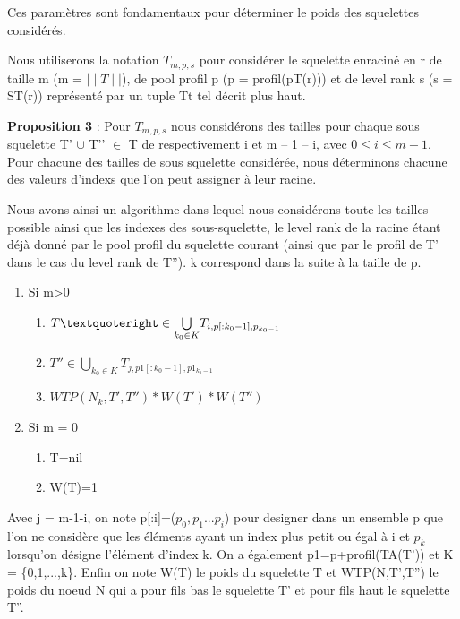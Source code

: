 \documentclass[french]{article}
\begin{document}
Ces paramètres sont fondamentaux pour déterminer le poids des squelettes considérés.

Nous utiliserons la notation \(T_{m,p,s} \) pour considérer le squelette enraciné en r de taille m (m =  \(\mid\mid T\mid\mid\)), de pool profil p (p = profil(pT(r))) et de level rank s (s = ST(r)) représenté par un tuple Tt tel décrit plus haut.


\textbf{Proposition 3} :  Pour \(T_{m,p,s} \) nous considérons des tailles pour chaque sous squelette T’ \(\cup\) T’’ \(\in\) T de respectivement i et m – 1 – i, avec \(0\leq i\leq m-1\). Pour chacune des tailles de sous squelette considérée, nous déterminons chacune des valeurs d'indexs que l'on peut assigner à leur racine.

Nous avons ainsi un algorithme dans lequel nous considérons toute les tailles possible ainsi que les indexes des sous-squelette, le level rank de la racine étant déjà donné par le pool profil du squelette courant (ainsi que par le profil de T' dans le cas du level rank de T''). k correspond dans la suite à la taille de p.

\begin{enumerate}
    \item Si m>0
        \begin{enumerate}
            \item
            \(T\textquoteright \in \underset{k_0\in K}{\bigcup} T_{i,p[:k_0-1],p_{k_0-1}} \)
            \item
            \(T'' \in \underset{k_0\in K}{\bigcup} T_{j,p1[:k_0-1],p1_{k_0-1}} \)
            \item
            $WTP(N_k,T',T'')*W(T')*W(T'')$
        \end{enumerate}
 
    \item Si m = 0
        \begin{enumerate} 
            \item
            T=nil 
            \item
            W(T)=1
        \end{enumerate}
\end{enumerate}
Avec j = m-1-i, on note p[:i]=(\(p_0,p_1...p_i\)) pour designer dans un ensemble p que l'on ne considère que les éléments ayant un index plus petit ou égal à i et \(p_{k}\) lorsqu'on désigne l'élément d'index k. On a également p1=p+profil(TA(T')) et K = \{0,1,...,k\}. Enfin on note W(T) le poids du squelette T et WTP(N,T',T'') le poids du noeud N qui a pour fils bas le squelette T' et pour fils haut le squelette T''.
\vspace{5mm} 
\end{document}
